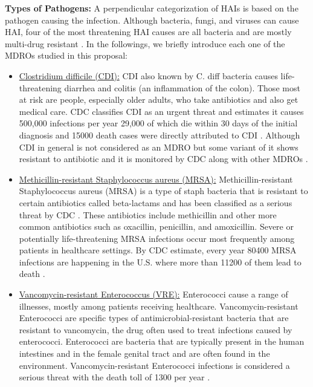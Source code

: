 {\bf Types of Pathogens:}
A perpendicular categorization of HAIs is based on the pathogen causing the infection. Although bacteria, fungi, and viruses can cause HAI, four of the most threatening HAI causes are all bacteria and are mostly multi-drug resistant  \cite{resistance, siegel2007management}. In the followings, we briefly introduce each one of the MDROs studied in this proposal:

\begin{itemize}
	\item \underline{Clostridium difficile (CDI):} CDI also known by C. diff bacteria causes life-threatening diarrhea and colitis (an inflammation of the colon). 
	Those most at risk are people, especially older adults, who take antibiotics and also get medical care. CDC classifies CDI as an urgent threat and estimates it causes 500,000 infections per year 29,000 of which die within 30 days of the initial diagnosis and 15000 death cases were directly attributed to CDI \cite{resistance}. Although CDI in general is not considered as an MDRO but some variant of it shows resistant to antibiotic  \cite{tenover2012antimicrobial, spigaglia2016recent} and it is monitored by CDC along with other MDROs \cite{cdimdro}. 
	\item \underline{Methicillin-resistant Staphylococcus aureus (MRSA):}  Methicillin-resistant Staphylococcus aureus (MRSA) is a type of staph bacteria that is resistant to certain antibiotics called beta-lactams and has been classified as a serious threat by CDC \cite{resistance}. These antibiotics include methicillin and other more common antibiotics such as oxacillin, penicillin, and amoxicillin. Severe or potentially life-threatening MRSA infections occur most frequently among patients in healthcare settings. By CDC estimate, every year 80400 MRSA infections are happening in the U.S. where more than 11200 of them lead to death \cite{resistance}. 
	\item \underline{Vancomycin-resistant Enterococcus (VRE):} Enterococci cause a range of illnesses, mostly among patients receiving healthcare. Vancomycin-resistant Enterococci are specific types of antimicrobial-resistant bacteria that are resistant to vancomycin, the drug often used to treat infections caused by enterococci. Enterococci are bacteria that are typically present in the human intestines and in the female genital tract and are often found in the environment. Vancomycin-resistant Enterococci infections is considered a serious threat with the death toll of 1300 per year \cite{resistance}.

\end{itemize}
